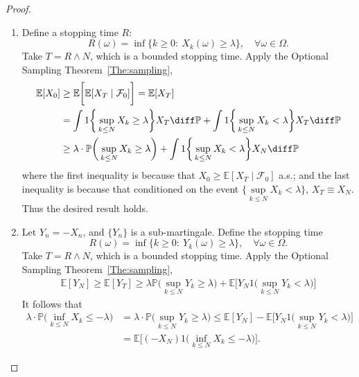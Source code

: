\begin{proof}
\begin{enumerate}
\item
Define a stopping time $R$:
\[
R(\omega) = \inf\{k\ge0:~X_k(\omega)\ge\lambda\},\quad\forall\omega\in\Omega.
\]
Take $T=R\land N$, which is a bounded stopping time. 
Apply the Optional Sampling Theorem~\ref{The:sampling},
\begin{align*}
\mathbb{E}[X_0]&\ge \mathbb{E}\bigg[
\mathbb{E}[X_T\mid\mathcal{F}_0]
\bigg]=\mathbb{E}[X_T]\\
&=\int 1\bigg\{
\sup\limits_{k\le N}X_k\ge\lambda
\bigg\}X_T\diff\mathbb{P}+\int 1\bigg\{
\sup\limits_{k\le N}X_k<\lambda
\bigg\}X_T\diff\mathbb{P}\\
&\ge
\lambda\cdot\mathbb{P}\bigg(
\sup\limits_{k\le N}X_k\ge\lambda
\bigg)+\int 1\bigg\{
\sup\limits_{k\le N}X_k<\lambda
\bigg\}X_N\diff\mathbb{P}
\end{align*}
where the first inequality is because that $X_0\ge\mathbb{E}[X_T\mid\mathcal{F}_0]$ a.s.;
and the last inequality is because that 
conditioned on the event $\bigg\{
\sup\limits_{k\le N}X_k<\lambda
\bigg\}$, 
$X_T\equiv X_N$.
%
Thus the desired result holds.
\item
Let $Y_n=-X_n$, and $\{Y_n\}$ is a sub-martingale.
Define the stopping time
\[
R(\omega) = \inf\{k\ge0:~Y_k(\omega)\ge\lambda\},\quad\forall\omega\in\Omega.
\]
Take $T=R\land N$, which is a bounded stopping time. 
Apply the Optional Sampling Theorem~\ref{The:sampling},
\begin{align*}
\mathbb{E}[Y_N]\ge\mathbb{E}[Y_T]\ge \lambda\mathbb{P}\bigg(
\sup\limits_{k\le N}Y_k\ge\lambda
\bigg)+\mathbb{E}\bigg[
Y_N1\bigg(
\sup\limits_{k\le N}Y_k<\lambda
\bigg)
\bigg]
\end{align*}
It follows that
\begin{align*}
\lambda\cdot\mathbb{P}\bigg(
\inf\limits_{k\le N}X_k\le-\lambda
\bigg)
&=
\lambda\cdot\mathbb{P}\bigg(
\sup\limits_{k\le N}Y_k\ge\lambda
\bigg)\le \mathbb{E}[Y_N] - \mathbb{E}\bigg[
Y_N1\bigg(
\sup\limits_{k\le N}Y_k<\lambda
\bigg)
\bigg]\\
&=\mathbb{E}\bigg[
(-X_N)1\bigg(
\inf\limits_{k\le N}X_k\le-\lambda
\bigg)
\bigg].
\end{align*}

\end{enumerate}
\end{proof}

